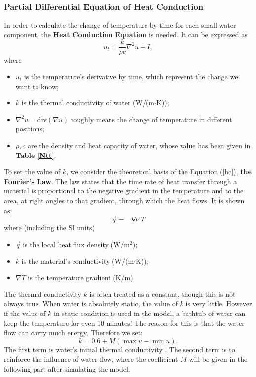 \documentclass{HZNUMCM}
\begin{document}
\subsubsection{Partial Differential Equation of Heat Conduction}\label{k}
In order to calculate the change of temperature by time for each small water component, the
\textbf{Heat Conduction Equation} is needed. It can be expressed as
\begin{equation}\label{hc}
u_{t}=\frac{k}{\rho c}\nabla^2u+I,
\end{equation}
where
\begin{itemize}
    \item {$u_{t}$} is the temperature's derivative by time, which represent the change we want to
    know;
    \item $k$ is the thermal conductivity of water (W/(m$\cdot$K));
    \item $\nabla^2u=\mathrm{div}(\nabla u)$ roughly means the change of temperature in different
    positions;
    \item $\rho,c$  are the density and heat capacity of water, whose value has been given in
    \textbf{Table \ref{Ntt}}.
\end{itemize}

To set the value of $k$, we consider the theoretical basis of the Equation (\ref{hc}), \textbf{the
Fourier's Law}. The law states that the time rate of heat transfer through a material is
proportional to the negative gradient in the temperature and to the area, at right angles to that
gradient, through which the heat flows. It is shown as:
\begin{equation}
\vec q=-k\nabla T
\end{equation}
where (including the SI units)
\begin{itemize}
    \item $ \vec q $  is the local heat flux density (W/m$^2$);
    \item $k$ is the material's conductivity (W/(m$\cdot$K));
    \item ${\nabla T}$ is the temperature gradient (K/m).
\end{itemize}

The thermal conductivity $k$ is often treated as a constant, though this is not always true. When
water is absolutely static, the value of $k$ is very little. However if the value of $k$ in static
condition is used in the model, a bathtub of water can keep the temperature for even 10 minutes! The
reason for this is that the water flow can carry much energy. Therefore we set:
\begin{equation}\label{u}
k=0.6+M(\max u-\min u).
\end{equation}
The first term is water's initial thermal conductivity \cite{2011_Ozturk_1532}. The second term is to reinforce
the influence of water flow, where the coefficient $M$ will be given in the following part after
simulating the model.
\end{document}
